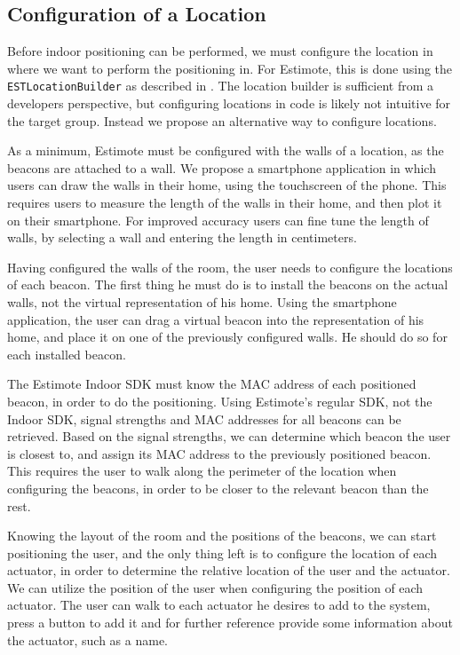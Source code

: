 \subsection{Configuration of a Location}
\label{sec:design:indoor-positioning:configuration-of-locations}

Before indoor positioning can be performed, 
we must configure the location in where we want to perform the positioning in. 
For Estimote, this is done using the \texttt{ESTLocationBuilder} as described in . 
The location builder is sufficient from a developers perspective, 
but configuring locations in code is likely not intuitive for the target group. 
Instead we propose an alternative way to configure locations.

As a minimum, Estimote must be configured with the walls of a location, 
as the beacons are attached to a wall. 
We propose a smartphone application in which users can draw the walls in their home, 
using the touchscreen of the phone. 
This requires users to measure the length of the walls in their home, 
and then plot it on their smartphone. 
For improved accuracy users can fine tune the length of walls, 
by selecting a wall and entering the length in centimeters.

Having configured the walls of the room, 
the user needs to configure the locations of each beacon. 
The first thing he must do is to install the beacons on the actual walls, 
\ie not the virtual representation of his home.
Using the smartphone application, the user can drag a virtual beacon into the representation of his home, 
and place it on one of the previously configured walls. 
He should do so for each installed beacon.


The Estimote Indoor SDK must know the MAC address of each positioned beacon, 
in order to do the positioning. 
Using Estimote's regular SDK, \ie not the Indoor SDK, 
signal strengths and MAC addresses for all beacons can be retrieved. 
Based on the signal strengths, 
we can determine which beacon the user is closest to, 
and assign its MAC address to the previously positioned beacon. 
This requires the user to walk along the perimeter of the location when configuring the beacons, 
in order to be closer to the relevant beacon than the rest.

Knowing the layout of the room and the positions of the beacons, 
we can start positioning the user, 
and the only thing left is to configure the location of each actuator, 
in order to determine the relative location of the user and the actuator. 
We can utilize the position of the user when configuring the position of each actuator. 
The user can walk to each actuator he desires to add to the system, 
press a button to add it and for further reference provide some information about the actuator, such as a name.

